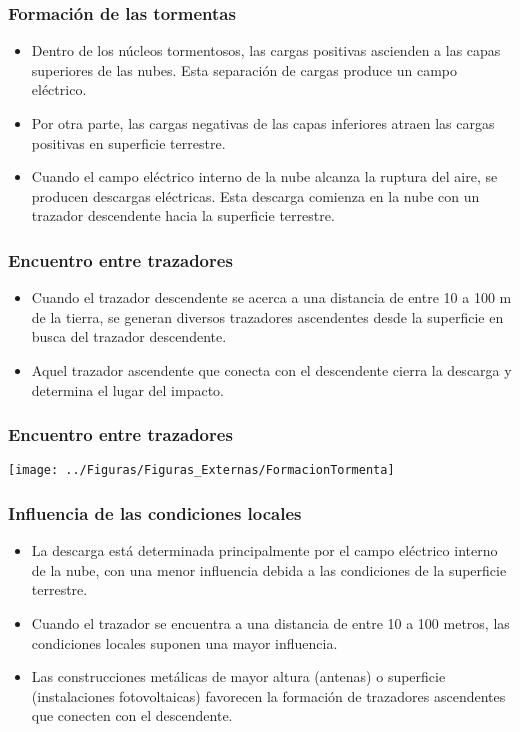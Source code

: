 \documentclass[serif, xcolor=dvipsnames]{beamer}
\begin{document}
\begin{frame}
\frametitle{Formación de las tormentas}
\begin{itemize}
\item Dentro de los núcleos tormentosos, las cargas positivas ascienden
a las capas superiores de las nubes. Esta separación de cargas produce
un campo eléctrico. 
\item Por otra parte, las cargas negativas de las capas inferiores atraen
las cargas positivas en superficie terrestre.
\item Cuando el campo eléctrico interno de la nube alcanza la ruptura del
aire, se producen descargas eléctricas. Esta descarga comienza en
la nube con un trazador descendente hacia la superficie terrestre. 
\end{itemize}

\end{frame}

\begin{frame}
\frametitle{Encuentro entre trazadores}
\begin{itemize}
\item Cuando el trazador descendente se acerca a una distancia de entre
10 a 100 m de la tierra, se generan diversos trazadores ascendentes
desde la superficie en busca del trazador descendente. 
\item Aquel trazador ascendente que conecta con el descendente cierra la
descarga y determina el lugar del impacto.
\end{itemize}

\end{frame}

\begin{frame}
\frametitle{Encuentro entre trazadores}

\begin{center}
\texttt{[image: ../Figuras/Figuras\_Externas/FormacionTormenta]}
\par\end{center}


\end{frame}

\begin{frame}
\frametitle{Influencia de las condiciones locales}
\begin{itemize}
\item La descarga está determinada principalmente por el campo eléctrico
interno de la nube, con una menor influencia debida a las condiciones
de la superficie terrestre.
\item Cuando el trazador se encuentra a una distancia de entre 10 a 100
metros, las condiciones locales suponen una mayor influencia.
\item Las construcciones metálicas de mayor altura (antenas) o superficie
(instalaciones fotovoltaicas) favorecen la formación de trazadores
ascendentes que conecten con el descendente.
\end{itemize}

\end{frame}
\end{document}
